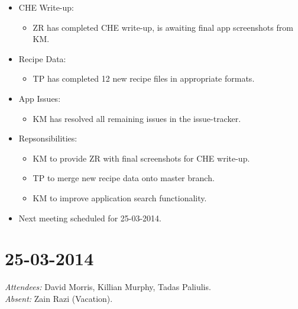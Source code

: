 \documentclass{article}
\begin{document}
\begin{itemize}
\item CHE Write-up:
  \begin{itemize}
  \item ZR has completed CHE write-up, is awaiting final app screenshots from KM.
  \end{itemize}
\item Recipe Data:
  \begin{itemize}
  \item TP has completed 12 new recipe files in appropriate formats.
  \end{itemize}
\item App Issues:
  \begin{itemize}
  \item KM has resolved all remaining issues in the issue-tracker.
  \end{itemize}
\item Repsonsibilities:
  \begin{itemize}
  \item KM to provide ZR with final screenshots for CHE write-up.
  \item TP to merge new recipe data onto master branch.
  \item KM to improve application search functionality.
  \end{itemize}
\item Next meeting scheduled for 25-03-2014.
\end{itemize}

\clearpage

\section*{25-03-2014}
\vspace{0.5cm}
\emph{Attendees: }David Morris, Killian Murphy, Tadas Paliulis.
\\
\emph{Absent: }Zain Razi (Vacation).
\end{document}
